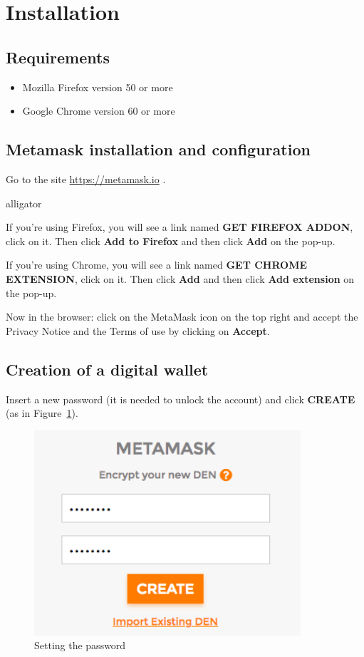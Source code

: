 \section{Installation}
\Warning{}
\subsection{Requirements}
\begin{itemize}
	\item Mozilla Firefox version 50 or more
	\item Google Chrome version 60 or more
\end{itemize}

\subsection{Metamask installation and configuration}
Go to the site \url{https://metamask.io} . 

\begin{labeling}{alligator}
	\item If you're using Firefox, you will see a link named \textbf{GET FIREFOX ADDON}, click on it. Then click \textbf{Add to Firefox} and then click \textbf{Add} on the pop-up.
	\item If you're using Chrome, you will see a link named \textbf{GET CHROME EXTENSION}, click on it. Then click \textbf{Add} and then click \textbf{Add extension} on the pop-up.
\end{labeling}
Now in the browser: click on the MetaMask icon on the top right and accept the Privacy Notice and the Terms of use by clicking on \textbf{Accept}.

\subsection{Creation of a digital wallet}
Insert a new password (it is needed to unlock the account) and click \textbf{CREATE} (as in Figure~\ref{fig:password}).
\begin{figure}[!h]
	\centering
	\includegraphics[height=3in]{img/password.png}
	\caption{Setting the password}
	\label{fig:password}
\end{figure}

